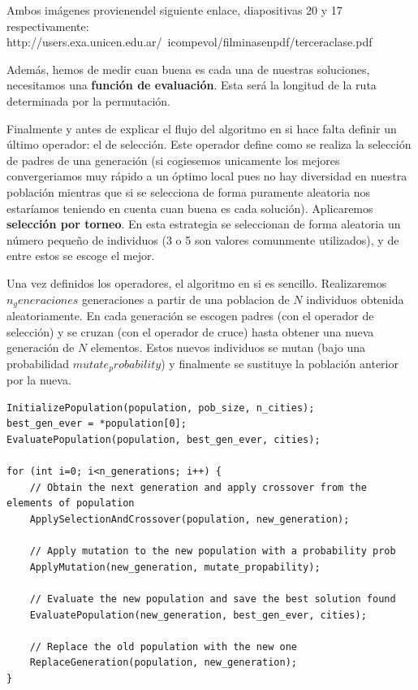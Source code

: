 \documentclass{article}
\begin{document}
Ambos imágenes provienendel siguiente enlace, diapositivas 20 y 17 respectivamente:
http://users.exa.unicen.edu.ar/~icompevol/filminasenpdf/terceraclase.pdf

Además, hemos de medir cuan buena es cada una de nuestras soluciones,
necesitamos una \textbf{función de evaluación}. Esta será la longitud
de la ruta determinada por la permutación.

Finalmente y antes de explicar el flujo del algoritmo en si hace falta
definir un último operador: el de selección. Este operador define como
se realiza la selección de padres de una generación (si cogiesemos
unicamente los mejores convergeriamos muy rápido a un óptimo local
pues no hay diversidad en nuestra población mientras que si se
selecciona de forma puramente aleatoria nos estaríamos teniendo en
cuenta cuan buena es cada solución). Aplicaremos \textbf{selección por
  torneo}. En esta estrategia se seleccionan de forma aleatoria un
número pequeño de individuos (3 o 5 son valores comunmente
utilizados), y de entre estos se escoge el mejor.

Una vez definidos los operadores, el algoritmo en si es
sencillo. Realizaremos $n_generaciones$ generaciones a partir de una
poblacion de $N$ individuos obtenida aleatoriamente. En cada
generación se escogen padres (con el operador de selección) y se
cruzan (con el operador de cruce) hasta obtener una nueva generación
de $N$ elementos. Estos nuevos individuos se mutan (bajo una
probabilidad $mutate_probability$) y finalmente se sustituye la
población anterior por la nueva.

\begin{lstlisting}
InitializePopulation(population, pob_size, n_cities);
best_gen_ever = *population[0];
EvaluatePopulation(population, best_gen_ever, cities);

for (int i=0; i<n_generations; i++) {
	// Obtain the next generation and apply crossover from the elements of population
	ApplySelectionAndCrossover(population, new_generation);
	
	// Apply mutation to the new population with a probability prob
	ApplyMutation(new_generation, mutate_propability);
	
	// Evaluate the new population and save the best solution found
	EvaluatePopulation(new_generation, best_gen_ever, cities);
	
	// Replace the old population with the new one
	ReplaceGeneration(population, new_generation);
}
\end{lstlisting}
\end{document}
